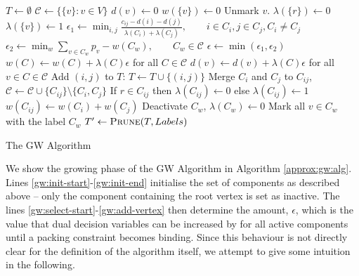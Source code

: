  
 \begin{algorithm}[h!]
   \begin{algorithmic}[1]
     \State $T \gets \emptyset$ \label{gw:init-start}
     \State $\mathcal{C} \gets \{\{v\} : v \in V\}$
       \State $d(v) \gets 0$
       \State $w(\{v\}) \gets 0$
       \State Unmark $v$.
         \State $\lambda(\{r\}) \gets 0$
       \Else
         \State $\lambda(\{v\}) \gets 1$
       \EndIf
     \EndFor \label{gw:init-end}
     \State $\epsilon_1 \gets \min_{i,j} \frac{c_{ij} - d(i) - d(j)}{\lambda (C_i) + \lambda(C_j)},
     \qquad i \in C_i, j \in C_j, C_i \neq C_j$ \label{gw:select-start}
     \State $\epsilon_2 \gets \min_{w} \sum_{v \in C_w} p_v - w(C_w), \qquad C_w \in \mathcal{C}$
     \State $\epsilon \gets \min(\epsilon_1, \epsilon_2)$ 
     \State $w(C) \gets w(C) + \lambda(C) \epsilon$ for all $C \in \mathcal{C}$ \label{gw:add-component}
     \State $d(v) \gets d(v) + \lambda(C) \epsilon$ for all $v \in C \in \mathcal{C}$ \label{gw:add-vertex}
     \State Add $(i,j)$ to $T$: $T \gets T \cup \{(i,j)\}$
     \State Merge $C_i$ and $C_j$ to $C_{ij}$,
     $\mathcal{C} \gets \mathcal{C} \cup \{C_{ij}\} \setminus \{C_i, C_j\}$
     \State If $r \in C_{ij}$ then $\lambda(C_{ij}) \gets 0$ else $\lambda(C_{ij}) \gets 1$
     \State $w(C_{ij}) \gets w(C_i) + w(C_j)$
     \Else
     \State Deactivate $C_w$, $\lambda(C_w) \gets 0$
     \State Mark all $v \in C_w$ with the label $C_w$
     \EndIf
     \EndWhile
     \State $T' \gets \Call{Prune}{T, Labels}$ 
   \EndProcedure
 \end{algorithmic}
 \caption{The GW Algorithm}\label{approx:gw:alg}
 \end{algorithm}

 We show the growing phase of the GW Algorithm in Algorithm \ref{approx:gw:alg}. Lines \ref{gw:init-start}-\ref{gw:init-end}
 initialise the set of components as described above -- only the component containing the root vertex is set as inactive.
 The lines \ref{gw:select-start}-\ref{gw:add-vertex} then determine the amount, $\epsilon$, which is
 the value that dual decision variables
 can be increased by for all active components
 until a packing constraint becomes binding. Since this behaviour is not directly clear for the definition of the algorithm itself,
  we attempt to give some intuition in the following.

